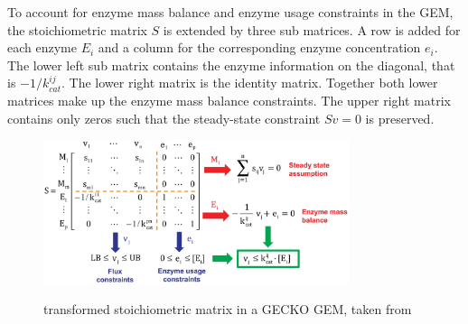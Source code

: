 To account for enzyme mass balance and enzyme usage constraints in the GEM, the stoichiometric matrix $S$ is extended by three sub matrices. 
A row is added for each enzyme $E_i$ and a column for the corresponding enzyme concentration $e_i$. The lower left sub matrix contains the enzyme information on the diagonal, that is $-1/k_{cat}^{ij}$. The lower right matrix is the identity matrix. Together both lower matrices make up the enzyme mass balance constraints. The upper right matrix contains only zeros such that the steady-state constraint $Sv=0$ is preserved.

\begin{figure}[h!]
    \caption{transformed stoichiometric matrix in a GECKO GEM, taken from \cite{improving_phenotype_predictions}}
    \centering
    \includegraphics[width=0.8\textwidth]{Images/gecko.jpg}
    \label{fig:gecko}
\end{figure}

\cite{improving_phenotype_predictions} %
